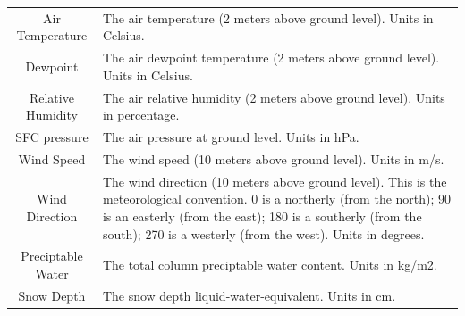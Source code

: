 \begin{table}[H]
\begin{adjustwidth*}{-3.0cm}{-3.0cm}
\begin{tabularx}{\linewidth}{cX}
                        Air Temperature                          & The air temperature (2 meters above ground level). Units in Celsius.                                                                                                                                                                                      \\
                        Dewpoint                                 & The air dewpoint temperature (2 meters above ground level). Units in Celsius.                                                                                                                                                                             \\
                        Relative Humidity                        & The air relative humidity (2 meters above ground level). Units in percentage.                                                                                                                                                                             \\
                        SFC pressure                             & The air pressure at ground level. Units in hPa.                                                                                                                                                                                                           \\
                        Wind Speed                               & The wind speed (10 meters above ground level). Units in m/s.                                                                                                                                                                                              \\
                        Wind Direction                           & The wind direction (10 meters above ground level). This is the meteorological convention. 0 is a northerly (from the north); 90 is an easterly (from the east); 180 is a southerly (from the south); 270 is a westerly (from the west). Units in degrees. \\
                        Preciptable Water                        & The total column preciptable water content. Units in kg/m2.                                                                                                                                                                                               \\
                        Snow Depth                               & The snow depth liquid-water-equivalent. Units in cm.                                                                                                                                                                                                      \\

\end{tabularx}
\end{adjustwidth*}
\end{table}
